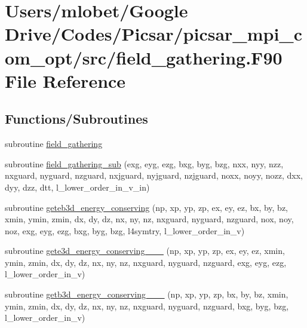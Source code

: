 \hypertarget{field__gathering_8_f90}{}\section{Users/mlobet/\+Google Drive/\+Codes/\+Picsar/picsar\+\_\+mpi\+\_\+com\+\_\+opt/src/field\+\_\+gathering.F90 File Reference}
\label{field__gathering_8_f90}
\subsection*{Functions/\+Subroutines}
\begin{DoxyCompactItemize}
\item 
subroutine \hyperlink{field__gathering_8_f90_a967586c463fd968e31a929a61e6e2b65}{field\+\_\+gathering}
\item 
subroutine \hyperlink{field__gathering_8_f90_a3048fd8eb5e48d87fa67d382d260b22f}{field\+\_\+gathering\+\_\+sub} (exg, eyg, ezg, bxg, byg, bzg, nxx, nyy, nzz, nxguard, nyguard, nzguard, nxjguard, nyjguard, nzjguard, noxx, noyy, nozz, dxx, dyy, dzz, dtt, l\+\_\+lower\+\_\+order\+\_\+in\+\_\+v\+\_\+in)
\item 
subroutine \hyperlink{field__gathering_8_f90_a97c6b6e6c658ab27a94491501be23409}{geteb3d\+\_\+energy\+\_\+conserving} (np, xp, yp, zp, ex, ey, ez, bx, by, bz, xmin, ymin, zmin, dx, dy, dz, nx, ny, nz, nxguard, nyguard, nzguard,                                                                                                                                                       nox, noy, noz, exg, eyg, ezg, bxg, byg, bzg, l4symtry, l\+\_\+lower\+\_\+order\+\_\+in\+\_\+v)
\item 
subroutine \hyperlink{field__gathering_8_f90_a573c1601d8884aa699121b456d176757}{gete3d\+\_\+energy\+\_\+conserving\+\_\+\_\+\_} (np, xp, yp, zp, ex, ey, ez, xmin, ymin, zmin,                                                                                                                                                           dx, dy, dz, nx, ny, nz, nxguard, nyguard, nzguard,                                                                                                                                                   exg, eyg, ezg, l\+\_\+lower\+\_\+order\+\_\+in\+\_\+v)
\item 
subroutine \hyperlink{field__gathering_8_f90_a7ba87c0bcb5818f003a2d33921b5e40d}{getb3d\+\_\+energy\+\_\+conserving\+\_\+\_\+\_} (np, xp, yp, zp, bx, by, bz, xmin, ymin, zmin,                                                                                                                                                           dx, dy, dz, nx, ny, nz, nxguard, nyguard, nzguard,                                                                                                                                                   bxg, byg, bzg, l\+\_\+lower\+\_\+order\+\_\+in\+\_\+v)

\end{DoxyCompactItemize}
